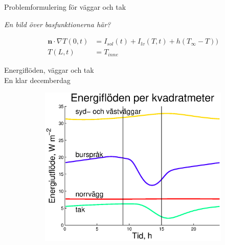 \begin{frame}{Problemformulering för väggar och tak}

\emph{\color{red} En bild över basfunktionerna här?}

\begin{align}
\mathbf{n}\cdot\nabla T(0,t) & = I_{sol}(t) + I_{lv}(T,t) + h(T_\infty-T))
\nonumber \\
T(L,t) & = T_{inne} \nonumber 
\end{align}

\end{frame}

\begin{frame}{Energiflöden, väggar och tak\\En klar decemberdag}
 
\begin{figure}
        \begin{subfigure}[b]{0.48\textwidth}
                \centering
                \includegraphics[width=\textwidth]{images/walls1.eps}
        \end{subfigure}
\end{figure}
\end{frame}

